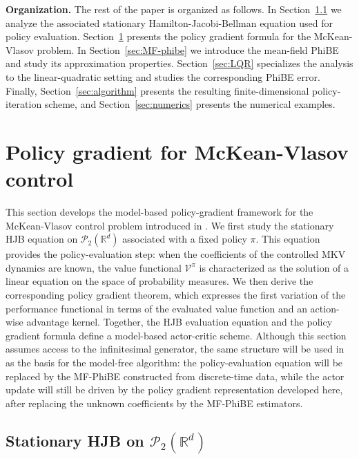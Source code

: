 \documentclass[a4paper, 10pt, english, reqno]{amsart}
\begin{document}
\smallbreak
\noindent
\textbf{Organization. }The rest of the paper is organized as follows. In
Section~\ref{sec:HJB_mkv} we analyze the associated stationary
Hamilton-Jacobi-Bellman equation used for policy evaluation.
Section~\ref{sec:policy-gradient} presents the policy gradient
formula for the McKean-Vlasov problem. In
Section~\ref{sec:MF-phibe} we introduce the mean-field PhiBE and study
its approximation properties. Section~\ref{sec:LQR}
specializes the analysis to the linear-quadratic setting and studies
the corresponding PhiBE error. Finally,
Section~\ref{sec:algorithm} presents the resulting
finite-dimensional policy-iteration scheme, and
Section~\ref{sec:numerics} presents the numerical examples.


\section{Policy gradient for McKean-Vlasov control}
\label{sec:policy-gradient}
This section develops the model-based policy-gradient framework for the McKean-Vlasov control problem introduced in . We first study the stationary HJB equation on $\mathcal P_2(\mathbb R^d)$ associated with a fixed policy $\pi$. This equation provides the policy-evaluation step: when the coefficients of the controlled MKV dynamics are known, the value functional $\mathcal V^\pi$ is characterized as the solution of a linear equation on the space of probability measures. We then derive the corresponding policy gradient theorem, which expresses the first variation of the performance functional in terms of the evaluated value function and an action-wise advantage kernel. Together, the HJB evaluation equation and the policy gradient formula define a model-based actor-critic scheme. Although this section assumes access to the infinitesimal generator, the same structure will be used in  as the basis for the model-free algorithm: the policy-evaluation equation will be replaced by the MF-PhiBE constructed from discrete-time data, while the actor update will still be driven by the policy gradient representation developed here, after replacing the unknown coefficients by the MF-PhiBE estimators.



\subsection{Stationary HJB on $\mathcal P_2(\mathbb R^d)$}
\label{sec:HJB_mkv}
\end{document}
